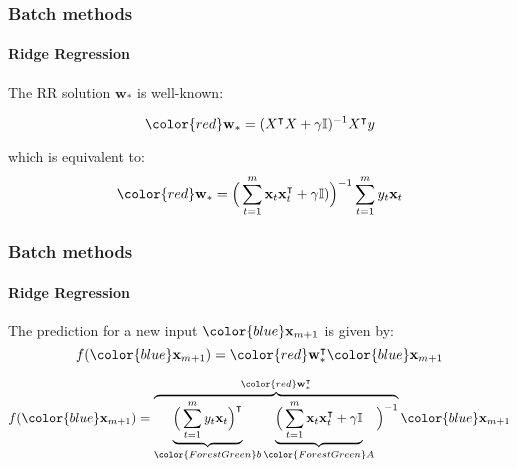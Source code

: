 \begin{frame}
    \frametitle{Batch methods}
    \framesubtitle{Ridge Regression}

    The RR solution $\mathbf{w}_*$ is well-known:

   \begin{equation*}
   {\color{red}\mathbf{w}_*}= (X^\intercal
   X+\gamma \mathbb{I})^{-1}X^\intercal y  
   \end{equation*}

   which is equivalent to:
   \begin{equation*}
   {\color{red}\mathbf{w}_*}= \Big (\sum_{t=1}^m \mathbf{x}_t \mathbf{x}_t
   ^\intercal + \gamma \mathbb{I})\Big )^{-1}
   \sum_{t=1}^m y_t \mathbf{x}_t
   \end{equation*}
   
\end{frame}


\begin{frame}
    \frametitle{Batch methods}
    \framesubtitle{Ridge Regression}
    The prediction for a new input $\color{blue}\mathbf{x}_{m+1}$ is given by:    
    \begin{equation*}
        f({\color{blue}\mathbf{x}_{m+1}})={\color{red}\mathbf{w}_*^\intercal}
        \color{blue}\mathbf{x}_{m+1}
    \end{equation*}

    \begin{equation*}
        f({\color{blue}\mathbf{x}_{m+1}}) = \displaystyle
        \overbrace{\underbrace{\Big( \sum_{t=1}^m y_t \mathbf{x}_t \Big
        )^\intercal}_{\color{ForestGreen}b} \underbrace{\Big (
        \sum_{t=1}^m \mathbf{x}_t \mathbf{x}_t  ^\intercal + \gamma
        \mathbb{I}}_{\color{ForestGreen}A}\Big)^{-1}}^{{\color{red}\mathbf{w}_*^\intercal}}  \color{blue}\mathbf{x}_{m+1} 
    \end{equation*}
\end{frame}


